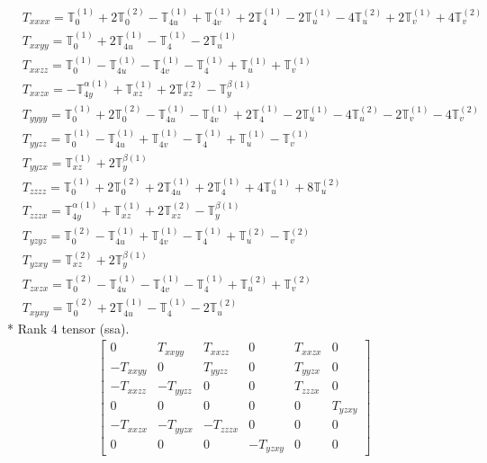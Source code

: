 \documentclass[fleqn,8pt,landscape]{jsarticle}
\begin{document}
\begin{align*}
& T_{xxxx} = \mathbb{T}_{0}^{(1)} + 2 \mathbb{T}_{0}^{(2)} - \mathbb{T}_{4u}^{(1)} + \mathbb{T}_{4v}^{(1)} + 2 \mathbb{T}_{4}^{(1)} - 2 \mathbb{T}_{u}^{(1)} - 4 \mathbb{T}_{u}^{(2)} + 2 \mathbb{T}_{v}^{(1)} + 4 \mathbb{T}_{v}^{(2)} \\
& T_{xxyy} = \mathbb{T}_{0}^{(1)} + 2 \mathbb{T}_{4u}^{(1)} - \mathbb{T}_{4}^{(1)} - 2 \mathbb{T}_{u}^{(1)} \\
& T_{xxzz} = \mathbb{T}_{0}^{(1)} - \mathbb{T}_{4u}^{(1)} - \mathbb{T}_{4v}^{(1)} - \mathbb{T}_{4}^{(1)} + \mathbb{T}_{u}^{(1)} + \mathbb{T}_{v}^{(1)} \\
& T_{xxzx} = - \mathbb{T}_{4y}^{\alpha(1)} + \mathbb{T}_{xz}^{(1)} + 2 \mathbb{T}_{xz}^{(2)} - \mathbb{T}_{y}^{\beta(1)} \\
& T_{yyyy} = \mathbb{T}_{0}^{(1)} + 2 \mathbb{T}_{0}^{(2)} - \mathbb{T}_{4u}^{(1)} - \mathbb{T}_{4v}^{(1)} + 2 \mathbb{T}_{4}^{(1)} - 2 \mathbb{T}_{u}^{(1)} - 4 \mathbb{T}_{u}^{(2)} - 2 \mathbb{T}_{v}^{(1)} - 4 \mathbb{T}_{v}^{(2)} \\
& T_{yyzz} = \mathbb{T}_{0}^{(1)} - \mathbb{T}_{4u}^{(1)} + \mathbb{T}_{4v}^{(1)} - \mathbb{T}_{4}^{(1)} + \mathbb{T}_{u}^{(1)} - \mathbb{T}_{v}^{(1)} \\
& T_{yyzx} = \mathbb{T}_{xz}^{(1)} + 2 \mathbb{T}_{y}^{\beta(1)} \\
& T_{zzzz} = \mathbb{T}_{0}^{(1)} + 2 \mathbb{T}_{0}^{(2)} + 2 \mathbb{T}_{4u}^{(1)} + 2 \mathbb{T}_{4}^{(1)} + 4 \mathbb{T}_{u}^{(1)} + 8 \mathbb{T}_{u}^{(2)} \\
& T_{zzzx} = \mathbb{T}_{4y}^{\alpha(1)} + \mathbb{T}_{xz}^{(1)} + 2 \mathbb{T}_{xz}^{(2)} - \mathbb{T}_{y}^{\beta(1)} \\
& T_{yzyz} = \mathbb{T}_{0}^{(2)} - \mathbb{T}_{4u}^{(1)} + \mathbb{T}_{4v}^{(1)} - \mathbb{T}_{4}^{(1)} + \mathbb{T}_{u}^{(2)} - \mathbb{T}_{v}^{(2)} \\
& T_{yzxy} = \mathbb{T}_{xz}^{(2)} + 2 \mathbb{T}_{y}^{\beta(1)} \\
& T_{zxzx} = \mathbb{T}_{0}^{(2)} - \mathbb{T}_{4u}^{(1)} - \mathbb{T}_{4v}^{(1)} - \mathbb{T}_{4}^{(1)} + \mathbb{T}_{u}^{(2)} + \mathbb{T}_{v}^{(2)} \\
& T_{xyxy} = \mathbb{T}_{0}^{(2)} + 2 \mathbb{T}_{4u}^{(1)} - \mathbb{T}_{4}^{(1)} - 2 \mathbb{T}_{u}^{(2)}
\end{align*}
* Rank 4 tensor (ssa).
\begin{align*}
\begin{bmatrix} 0 & T_{xxyy} & T_{xxzz} & 0 & T_{xxzx} & 0 \\ - T_{xxyy} & 0 & T_{yyzz} & 0 & T_{yyzx} & 0 \\ - T_{xxzz} & - T_{yyzz} & 0 & 0 & T_{zzzx} & 0 \\ 0 & 0 & 0 & 0 & 0 & T_{yzxy} \\ - T_{xxzx} & - T_{yyzx} & - T_{zzzx} & 0 & 0 & 0 \\ 0 & 0 & 0 & - T_{yzxy} & 0 & 0 \end{bmatrix}
\end{align*}
\end{document}
